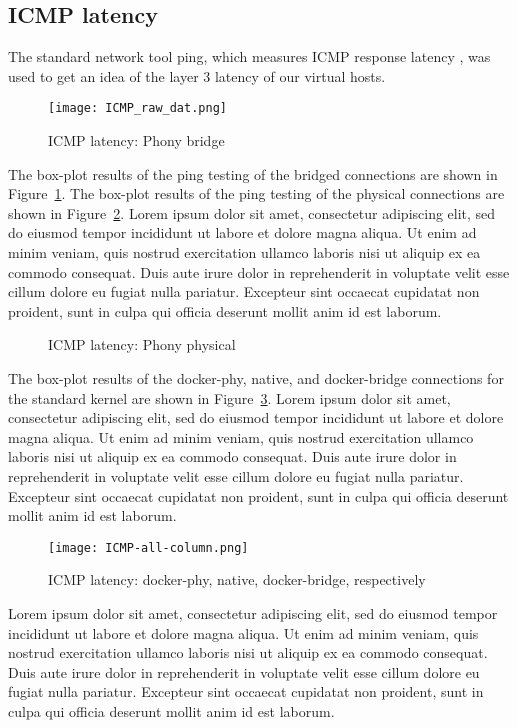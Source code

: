 \subsection{ICMP latency} %
\label{sub:icmplatency}
The standard network tool ping, which measures ICMP response latency \autocite{pingexplained}, was used to get an idea of the layer 3 latency of our virtual hosts.  
\begin{figure}
    \centering
    \texttt{[image: ICMP\_raw\_dat.png]}
%    
    \caption{ICMP latency: Phony bridge}
    \label{fig:icmplatencybridge}
\end{figure}
The box-plot results of the ping testing of the bridged connections are shown in Figure~\ref{fig:icmplatencybridge}.  
The box-plot results of the ping testing of the physical connections are shown in Figure~\ref{fig:icmplatencyphys}.  
Lorem ipsum dolor sit amet, consectetur adipiscing elit, sed do eiusmod tempor incididunt ut labore et dolore magna aliqua. Ut enim ad minim veniam, quis nostrud exercitation ullamco laboris nisi ut aliquip ex ea commodo consequat. Duis aute irure dolor in reprehenderit in voluptate velit esse cillum dolore eu fugiat nulla pariatur. Excepteur sint occaecat cupidatat non proident, sunt in culpa qui officia deserunt mollit anim id est laborum.
\begin{figure}
    \centering
    \def\svgwidth{\columnwidth}
    
    \caption{ICMP latency: Phony physical}
    \label{fig:icmplatencyphys}
\end{figure}
The box-plot results of the docker-phy, native, and docker-bridge connections for the standard kernel are shown in Figure~\ref{fig:icmplatencyphony}.  
Lorem ipsum dolor sit amet, consectetur adipiscing elit, sed do eiusmod tempor incididunt ut labore et dolore magna aliqua. Ut enim ad minim veniam, quis nostrud exercitation ullamco laboris nisi ut aliquip ex ea commodo consequat. Duis aute irure dolor in reprehenderit in voluptate velit esse cillum dolore eu fugiat nulla pariatur. Excepteur sint occaecat cupidatat non proident, sunt in culpa qui officia deserunt mollit anim id est laborum.
\begin{figure}
    \centering
    \texttt{[image: ICMP-all-column.png]}
    \caption{ICMP latency: docker-phy, native, docker-bridge, respectively}
    \label{fig:icmplatencyphony}
\end{figure}
Lorem ipsum dolor sit amet, consectetur adipiscing elit, sed do eiusmod tempor incididunt ut labore et dolore magna aliqua. Ut enim ad minim veniam, quis nostrud exercitation ullamco laboris nisi ut aliquip ex ea commodo consequat. Duis aute irure dolor in reprehenderit in voluptate velit esse cillum dolore eu fugiat nulla pariatur. Excepteur sint occaecat cupidatat non proident, sunt in culpa qui officia deserunt mollit anim id est laborum.



